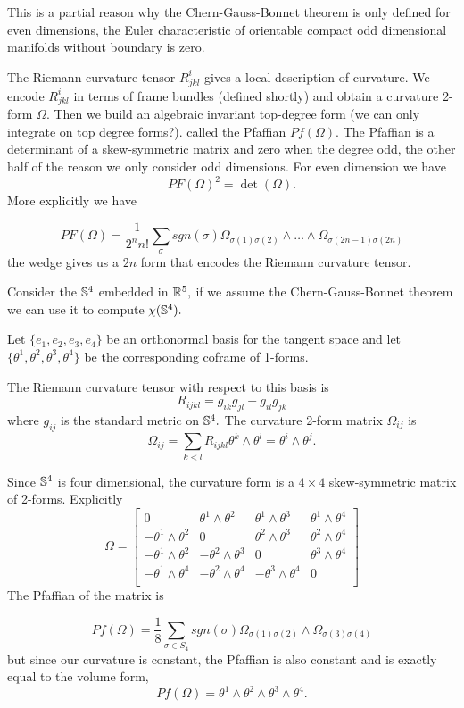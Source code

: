 This is a partial reason why the Chern-Gauss-Bonnet theorem is only defined
for even dimensions, the Euler characteristic of orientable compact odd dimensional
manifolds without boundary is zero.

The Riemann curvature tensor $R^i_{jkl}$ gives a local description of curvature.
We encode $R^i_{jkl}$ in terms of frame bundles (defined shortly) and obtain
a curvature 2-form $\Omega$. Then we build an algebraic invariant top-degree form
(we can only integrate on top degree forms?). called the Pfaffian $Pf(\Omega)$.
The Pfaffian is a determinant of a skew-symmetric matrix and zero when the degree odd,
the other half of the reason we only consider odd dimensions.
For even dimension we have $$PF(\Omega)^2=\det(\Omega).$$
More explicitly we have 

$$PF(\Omega)=\frac{1}{2^n n!}\sum_{\sigma}sgn(\sigma)\Omega_{\sigma(1)\sigma(2)}\land \ldots \land \Omega_{\sigma(2n-1)\sigma(2n)}$$
the wedge gives us a $2n$ form that encodes the Riemann curvature tensor.

\begin{example}
Consider the $\mathbb{S}^4$ embedded in $\mathbb{R}^5,$ if we assume the Chern-Gauss-Bonnet
theorem we can use it to compute $\chi(\mathbb{S}^4).$

Let $\{e_1,e_2,e_3,e_4\}$ be an orthonormal basis for the tangent space
and let $\{\theta^1,\theta^2,\theta^3,\theta^4\}$ be the corresponding coframe
of 1-forms.

The Riemann curvature tensor with respect to this basis is
$$R_{ijkl}=g_{ik}g_{jl}-g_{il}g_{jk}$$
where $g_{ij}$ is the standard metric on $\mathbb{S}^4.$
The curvature 2-form matrix $\Omega_{ij}$ is
$$\Omega_{ij}=\sum_{k<l}R_{ijkl}\theta^k \land \theta^l=\theta^i\land \theta^j.$$

Since $\mathbb{S}^4$ is four dimensional, the curvature form is a $4\times 4$ skew-symmetric
matrix of 2-forms. 
Explicitly
$$\Omega = \begin{bmatrix}
0 & \theta^1\land \theta^2 & \theta^1\land \theta^3 & \theta^1\land \theta^4\\
- \theta^1\land \theta^2 & 0 & \theta^2\land \theta^3 & \theta^2\land \theta^4\\
- \theta^1\land \theta^2 & - \theta^2\land \theta^3 & 0 & \theta^3\land \theta^4\\
- \theta^1\land \theta^4 & - \theta^2\land \theta^4 & - \theta^3\land \theta^4 & 0\\
\end{bmatrix}$$
The Pfaffian of the matrix is


$$Pf(\Omega)=\frac{1}{8}\sum_{\sigma\in S_4}sgn(\sigma)\Omega_{\sigma(1)\sigma(2)}\land \Omega_{\sigma(3)\sigma(4)}$$
but since our curvature is constant, the Pfaffian is also constant and is exactly
equal to the volume form,
$$Pf(\Omega)= \theta^1\land \theta^2\land \theta^3\land \theta^4.$$


\end{example}


